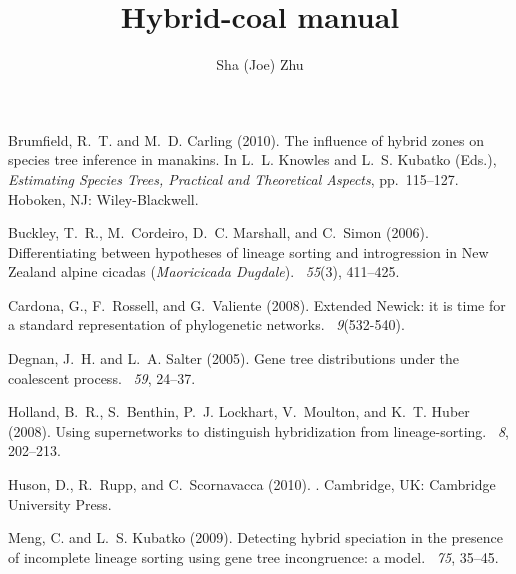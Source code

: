 \documentclass[12pt]{article}
\begin{document}
\title{Hybrid-coal manual}
\author{Sha (Joe) Zhu}
\maketitle



\begin{thebibliography}{}

Brumfield, R.~T. and M.~D. Carling (2010).
\newblock The influence of hybrid zones on species tree inference in manakins.
\newblock In L.~L. Knowles and L.~S. Kubatko (Eds.), {\em Estimating Species
  Trees, Practical and Theoretical Aspects}, pp.\  115--127. Hoboken, NJ:
  Wiley-Blackwell.

Buckley, T.~R., M.~Cordeiro, D.~C. Marshall, and C.~Simon (2006).
\newblock Differentiating between hypotheses of lineage sorting and
  introgression in {New Zealand} alpine cicadas (\emph{{M}aoricicada
  {D}ugdale}).
~{\em 55\/}(3), 411--425.

Cardona, G., F.~Rossell, and G.~Valiente (2008).
\newblock Extended {N}ewick: it is time for a standard representation of
  phylogenetic networks.
~{\em 9\/}(532-540).

Degnan, J.~H. and L.~A. Salter (2005).
\newblock Gene tree distributions under the coalescent process.
~{\em 59}, 24--37.

Holland, B.~R., S.~Benthin, P.~J. Lockhart, V.~Moulton, and K.~T. Huber (2008).
\newblock Using supernetworks to distinguish hybridization from
  lineage-sorting.
~{\em 8}, 202--213.

Huson, D., R.~Rupp, and C.~Scornavacca (2010).
.
\newblock Cambridge, UK: Cambridge University Press.

Meng, C. and L.~S. Kubatko (2009).
\newblock Detecting hybrid speciation in the presence of incomplete lineage
  sorting using gene tree incongruence: a model.
~{\em 75}, 35--45.


\end{thebibliography}
\end{document}

